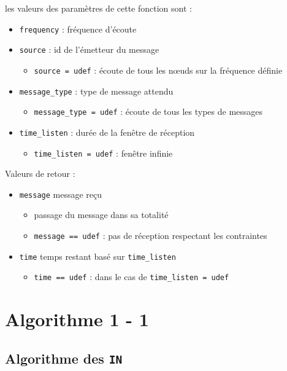 les valeurs des paramètres de cette fonction sont :
\begin{itemize}
  \item \texttt{frequency} : fréquence d'écoute
  \item \texttt{source} : id de l'émetteur du message
  \begin{itemize}
    \item \texttt{source = udef} : écoute de tous les n{\oe}uds sur la fréquence définie
  \end{itemize}
  \item \texttt{message\_type} : type de message attendu
  \begin{itemize}
    \item \texttt{message\_type = udef} : écoute de tous les types de messages
  \end{itemize}
  \item \texttt{time\_listen} : durée de la fenêtre de réception
  \begin{itemize}
    \item \texttt{time\_listen = udef} : fenêtre infinie
  \end{itemize}
\end{itemize}

Valeurs de retour :

\begin{itemize}
  \item \texttt{message} message reçu
  \begin{itemize}
    \item passage du message dans sa totalité
    \item \texttt{message == udef} : pas de réception respectant les contraintes
  \end{itemize}
  \item \texttt{time} temps restant basé sur \texttt{time\_listen}
  \begin{itemize}
    \item \texttt{time == udef} : dans le cas de \texttt{time\_listen = udef}
  \end{itemize}
\end{itemize}

\section{Algorithme 1 - 1}

\subsection{Algorithme des \texttt{IN}}


